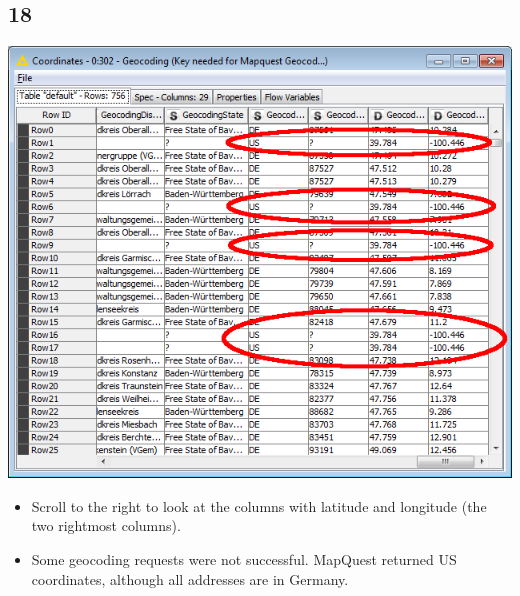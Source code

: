 \documentclass{beamer}
\begin{document}
\subsection{18}
\begin{frame}
	\begin{center}
  		\includegraphics[height=0.6\textheight]{18.png}
	\end{center}
	\begin{itemize}
		\item Scroll to the right to look at the columns with latitude and longitude (the two rightmost columns).
		\item Some geocoding requests were not successful. MapQuest returned US coordinates, although all addresses are in Germany.
	\end{itemize}
\end{frame}
\end{document}
